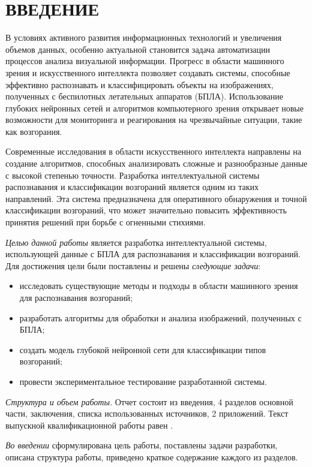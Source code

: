 \section*{ВВЕДЕНИЕ}

В условиях активного развития информационных технологий и увеличения объемов данных, особенно актуальной становится задача автоматизации процессов анализа визуальной информации. Прогресс в области машинного зрения и искусственного интеллекта позволяет создавать системы, способные эффективно распознавать и классифицировать объекты на изображениях, полученных с беспилотных летательных аппаратов (БПЛА). Использование глубоких нейронных сетей и алгоритмов компьютерного зрения открывает новые возможности для мониторинга и реагирования на чрезвычайные ситуации, такие как возгорания.

Современные исследования в области искусственного интеллекта направлены на создание алгоритмов, способных анализировать сложные и разнообразные данные с высокой степенью точности. Разработка интеллектуальной системы распознавания и классификации возгораний является одним из таких направлений. Эта система предназначена для оперативного обнаружения и точной классификации возгораний, что может значительно повысить эффективность принятия решений при борьбе с огненными стихиями.

\emph{Целью данной работы} является разработка интеллектуальной системы, использующей данные с БПЛА для распознавания и классификации возгораний. Для достижения цели были поставлены и решены \emph{следующие задачи}:
\begin{itemize}
\item исследовать существующие методы и подходы в области машинного зрения для распознавания возгораний;
\item разработать алгоритмы для обработки и анализа изображений, полученных с БПЛА;
\item создать модель глубокой нейронной сети для классификации типов возгораний;
\item провести экспериментальное тестирование разработанной системы.
\end{itemize}

\emph{Структура и объем работы.} Отчет состоит из введения, 4 разделов основной части, заключения, списка использованных источников, 2 приложений. Текст выпускной квалификационной работы равен .

\emph{Во введении} сформулирована цель работы, поставлены задачи разработки, описана структура работы, приведено краткое содержание каждого из разделов.

